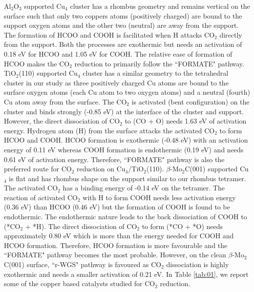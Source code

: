 Al$_2$O$_3$ supported Cu$_4$ cluster\cite{liu2015carbon} has a rhombus geometry and remains vertical on the surface such that only two coppers atoms (positively charged) are bound to the support oxygen atoms and the other two (neutral) are away from the support. The formation of HCOO and COOH is facilitated when H attacks CO$_2$ directly from the support. Both the processes are exothermic but needs an activation of 0.18 eV for HCOO and 1.05 eV for COOH. The relative ease of formation of HCOO makes the CO$_2$ reduction to primarily follow the ``FORMATE" pathway. TiO$_2$(110) supported Cu$_4$ cluster\cite{tao2019best} has a similar geometry to the tetrahedral cluster in our study as three positively charged Cu atoms are bound to the surface oxygen atoms (each Cu atom to two oxygen atoms) and a neutral (fourth) Cu atom away from the surface. The CO$_2$ is activated (bent configuration) on the cluster and binds strongly (-0.85 eV) at the interface of the cluster and support. However, the direct dissociation of CO$_2$ to (CO + O) needs 1.63 eV of activation energy. Hydrogen atom (H) from the surface attacks the activated CO$_2$ to form HCOO and COOH. HCOO formation is exothermic (-0.48 eV) with an activation energy of 0.11 eV whereas COOH formation is endothermic (0.19 eV) and needs 0.61 eV of activation energy. Therefore, ``FORMATE" pathway is also the preferred route for CO$_2$ reduction on Cu$_4$/TiO$_2$(110). $\beta$-Mo$_2$C(001) supported Cu$_4$\cite{posada2016conversion} is flat and has rhombus shape on the support similar to our rhombus tetramer. The activated CO$_2$ has a binding energy of -0.14 eV on the tetramer. The reaction of activated CO$_2$ with H to form COOH needs less activation energy (0.36 eV) than HCOO (0.46 eV) but the formation of COOH is found to be endothermic. The endothermic nature leads to the back dissociation of COOH to (*CO$_2$ + *H). The direct dissociation of CO$_2$ to form  (*CO + *O) needs approximately 0.80 eV which is more than the energy needed for COOH and HCOO formation. Therefore, HCOO formation is more favourable and the ``FORMATE" pathway becomes the most probable. However, on the clean  $\beta$-Mo$_2$C(001) surface, ``r-WGS" pathway is favoured as CO$_2$ dissociation is highly exothermic and needs a smaller activation of 0.21 eV. In Table \ref{tab:01}, we report some of the copper based catalysts studied for CO$_2$ reduction.

